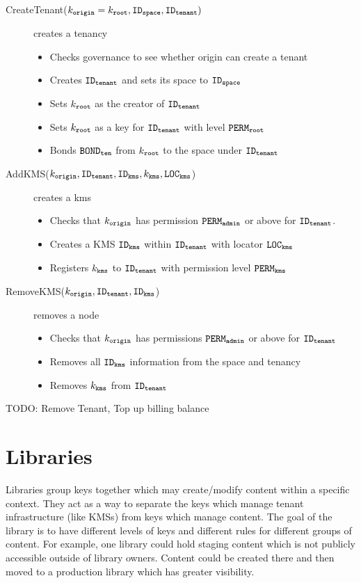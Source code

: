 \documentclass{article}
\begin{document}
\begin{description}
  \item[CreateTenant($k_\mathtt{origin} = k_\mathtt{root}, \mathtt{ID_{space}}, \mathtt{ID_{tenant}})$] creates a tenancy
    \begin{itemize}
      \item Checks governance to see whether origin can create a tenant
      \item Creates $\mathtt{ID_{tenant}}$ and sets its space to $\mathtt{ID_{space}}$
      \item Sets $k_\mathtt{root}$ as the creator of $\mathtt{ID_{tenant}}$
      \item Sets $k_\mathtt{root}$ as a key for $\mathtt{ID_{tenant}}$ with level $\mathtt{PERM_{root}}$
      \item Bonds $\mathtt{BOND_{ten}}$ from $k_\mathtt{root}$ to the space under $\mathtt{ID_{tenant}}$
    \end{itemize}
  \item[AddKMS($k_\mathtt{origin}, \mathtt{ID_{tenant}}, \mathtt{ID_{kms}}, k_\mathtt{kms}, \mathtt{LOC_{kms}}$)] creates a kms
    \begin{itemize}
      \item Checks that $k_\mathtt{origin}$ has permission $\mathtt{PERM_{admin}}$ or above for $\mathtt{ID_{tenant}}$.
      \item Creates a KMS $\mathtt{ID_{kms}}$ within $\mathtt{ID_{tenant}}$ with locator $\mathtt{LOC_{kms}}$
      \item Registers $k_\mathtt{kms}$ to $\mathtt{ID_{tenant}}$ with permission level $\mathtt{PERM_{kms}}$
    \end{itemize}
  \item[RemoveKMS($k_\mathtt{origin}, \mathtt{ID_{tenant}}, \mathtt{ID_{kms}}$)] removes a node
    \begin{itemize}
      \item Checks that $k_\mathtt{origin}$ has permissions $\mathtt{PERM_{admin}}$ or above for $\mathtt{ID_{tenant}}$
      \item Removes all $\mathtt{ID_{kms}}$ information from the space and tenancy
      \item Removes $k_\mathtt{kms}$ from $\mathtt{ID_{tenant}}$
    \end{itemize}
  \item[TODO: Remove Tenant, Top up billing balance]
\end{description}

\section{Libraries}
Libraries group keys together which may create/modify content within a specific context. 
They act as a way to separate the keys which manage tenant infrastructure (like KMSs) from keys which manage content.
The goal of the library is to have different levels of keys and different rules for different groups of content.
For example, one library could hold staging content which is not publicly accessible outside of library owners.
Content could be created there and then moved to a production library which has greater visibility.
\end{document}
